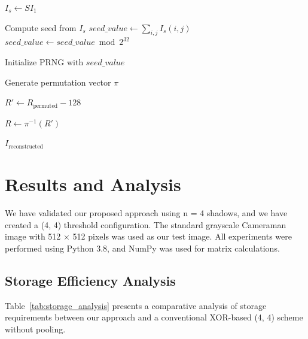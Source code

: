 \begin{algorithm}[H]
\small
\caption{Reveal Phase}
\label{alg:reconstruction}
\LinesNumbered
\setcounter{AlgoLine}{0}



$I_s \gets SI_1$\;


Compute seed from $I_s$\;
$seed\_value \gets \sum_{i,j} I_s(i,j)$\;
$seed\_value \gets seed\_value \bmod 2^{32}$\;

Initialize PRNG with $seed\_value$\;

Generate permutation vector $\pi$\;

$R' \gets R_{\text{permuted}} - 128$\;

$R \gets \pi^{-1}(R')$\;


\Return $I_{\text{reconstructed}}$\;

\end{algorithm}

\section{Results and Analysis}
\label{sec:lad-results}


We have validated our proposed approach using n = 4 shadows, and we have created a (4, 4) threshold configuration. The standard grayscale Cameraman image with 512 × 512 pixels was used as our test image. All experiments were performed using Python 3.8, and NumPy was used for matrix calculations.

\subsection{Storage Efficiency Analysis}

Table~\ref{tab:storage_analysis} presents a comparative analysis of storage requirements between our approach and a conventional XOR-based (4, 4) scheme without pooling.

